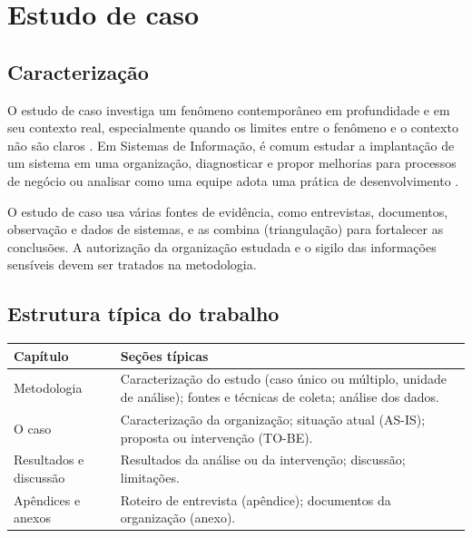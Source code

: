 \section{Estudo de caso}
\label{sec_tipo_estudo_caso}

\subsection{Caracterização}

O estudo de caso investiga um fenômeno contemporâneo em profundidade e em seu contexto real, especialmente quando os limites entre o fenômeno e o contexto não são claros \cite{yin2015estudo}. Em Sistemas de Informação, é comum estudar a implantação de um sistema em uma organização, diagnosticar e propor melhorias para processos de negócio \cite{dumas2018fundamentals} ou analisar como uma equipe adota uma prática de desenvolvimento \cite{runeson2009guidelines}.

O estudo de caso usa várias fontes de evidência, como entrevistas, documentos, observação e dados de sistemas, e as combina (triangulação) para fortalecer as conclusões. A autorização da organização estudada e o sigilo das informações sensíveis devem ser tratados na metodologia.

\subsection{Estrutura típica do trabalho}

\begin{quadro}[htb]
	\centering
	\caption{Estrutura típica de um TCC de estudo de caso.}
	\label{qua_estrutura_estudo_caso}
	\small
	\begin{tabularx}{\textwidth}{|l|X|}
		\hline
		\textbf{Capítulo} & \textbf{Seções típicas} \\ \hline
		Metodologia & Caracterização do estudo (caso único ou múltiplo, unidade de análise); fontes e técnicas de coleta; análise dos dados. \\ \hline
		O caso & Caracterização da organização; situação atual (AS-IS); proposta ou intervenção (TO-BE). \\ \hline
		Resultados e discussão & Resultados da análise ou da intervenção; discussão; limitações. \\ \hline
		Apêndices e anexos & Roteiro de entrevista (apêndice); documentos da organização (anexo). \\ \hline
	\end{tabularx}
\end{quadro}

